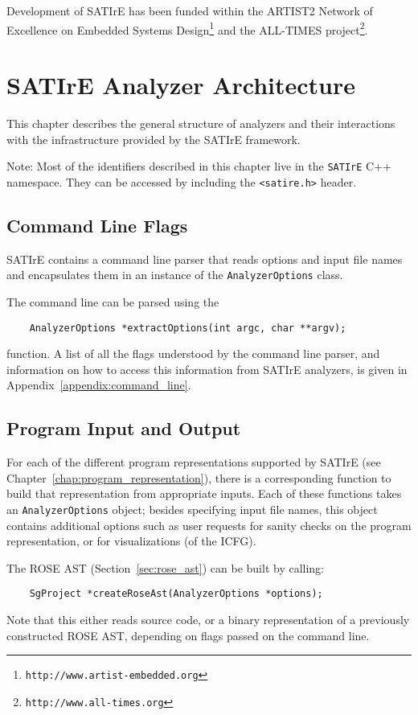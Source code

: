 \documentclass[a4paper,12pt]{report}
\begin{document}
Development of SATIrE has been funded within the ARTIST2 Network of
Excellence on Embedded Systems
Design\footnote{\texttt{http://www.artist-embedded.org}} and the ALL-TIMES
project\footnote{\texttt{http://www.all-times.org}}.

\chapter{SATIrE Analyzer Architecture}
\label{chap:analyzer}

This chapter describes the general structure of analyzers and their
interactions with the infrastructure provided by the SATIrE framework.

Note: Most of the identifiers described in this chapter live in the
\texttt{SATIrE} C++ namespace. They can be accessed by including the
\verb|<satire.h>| header.

\section{Command Line Flags}
\label{sec:command_line}

SATIrE contains a command line parser that reads options and input file
names and encapsulates them in an instance of the \texttt{AnalyzerOptions}
class.

The command line can be parsed using the
\begin{verbatim}
    AnalyzerOptions *extractOptions(int argc, char **argv);
\end{verbatim}
function. A list of all the flags understood by the command line parser, and
information on how to access this information from SATIrE analyzers, is
given in Appendix~\ref{appendix:command_line}.

\section{Program Input and Output}
\label{sec:program_io}

For each of the different program representations supported by SATIrE
(see Chapter~\ref{chap:program_representation}), there is a corresponding
function to build that representation from appropriate inputs. Each of these
functions takes an \texttt{AnalyzerOptions} object; besides specifying input
file names, this object contains additional options such as user requests
for sanity checks on the program representation, or for visualizations (of
the ICFG).

The ROSE AST (Section~\ref{sec:rose_ast}) can be built by calling:
\begin{verbatim}
    SgProject *createRoseAst(AnalyzerOptions *options);
\end{verbatim}
Note that this either reads source code, or a binary representation of a
previously constructed ROSE AST, depending on flags passed on the command
line.
\end{document}
